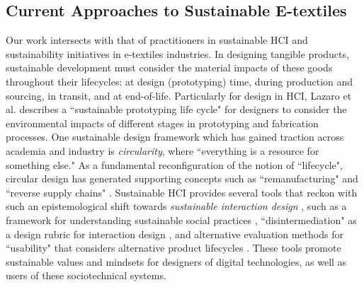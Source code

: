\subsection{Current Approaches to Sustainable E-textiles}

Our work intersects with that of practitioners in sustainable HCI and sustainability initiatives in e-textiles industries. In designing tangible products, sustainable development must consider the material impacts of these goods throughout their lifecycles: at design (prototyping) time, during production and sourcing, in transit, and at end-of-life. Particularly for design in HCI, Lazaro et al. \cite{lazaro_sustainable_2020} describes a ``sustainable prototyping life cycle" for designers to consider the environmental impacts of different stages in prototyping and fabrication processes. One sustainable design framework which has gained traction across academia and industry is \textit{circularity}, where ``everything is a resource for something else." \cite{c2c_green_2017} As a fundamental reconfiguration of the notion of ``lifecycle", circular design has generated supporting concepts such as ``remanufacturing" \cite{nasr_fundamentals_2020} and ``reverse supply chains" \cite{battaia_reverse_2015}. Sustainable HCI provides several tools that reckon with such an epistemological shift towards \textit{sustainable interaction design} \cite{blevis_sustainable_2007}, such as a framework for understanding sustainable social practices \cite{entwistle_beyond_2015}, ``disintermediation" as a design rubric for interaction design \cite{raghavan_means_2017}, and alternative evaluation methods for ``usability" that considers alternative product lifecycles \cite{remy_evaluation_2018}. These tools promote sustainable values and mindsets for designers of digital technologies, as well as users of these sociotechnical systems. 

